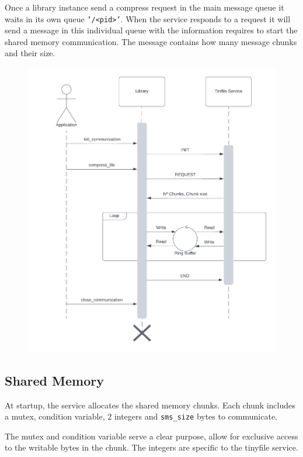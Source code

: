 \documentclass[12pt]{article}
\begin{document}
\par Once a library instance send a compress request in the main message queue it waits in its own queue \texttt{'/<pid>'}. When the service responds to a request it will send a message in this individual queue with the information requires to start the shared memory communication. The message contains how many message chunks and their size.

\begin{figure}[h]
\centering
\includegraphics[width=\textwidth]{AOS-communication.png}
\end{figure}
\FloatBarrier
\newpage

\subsection*{Shared Memory}

\par At startup, the service allocates the shared memory chunks. Each chunk includes a mutex, condition variable, 2 integers and \texttt{sms\_size} bytes to communicate.

\par The mutex and condition variable serve a clear purpose, allow for exclusive access to the writable bytes in the chunk. The integers are specific to the tinyfile service.
\end{document}
